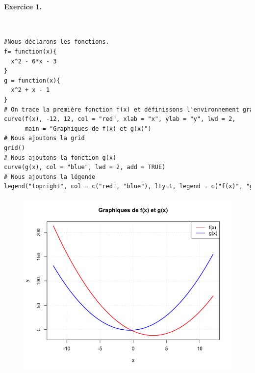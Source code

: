 \paragraph{Exercice 1. }\textcolor{white}{.}\newline
\begin{lstlisting}[language=html]
#Nous déclarons les fonctions.
f= function(x){
  x^2 - 6*x - 3
}
g = function(x){
  x^2 + x - 1 
}
# On trace la première fonction f(x) et définissons l'environnement graphique
curve(f(x), -12, 12, col = "red", xlab = "x", ylab = "y", lwd = 2,
      main = "Graphiques de f(x) et g(x)")
# Nous ajoutons la grid
grid()
# Nous ajoutons la fonction g(x)
curve(g(x), col = "blue", lwd = 2, add = TRUE)
# Nous ajoutons la légende
legend("topright", col = c("red", "blue"), lty=1, legend = c("f(x)", "g(x)"))
\end{lstlisting}
\begin{figure}[H]\begin{center}\includegraphics[scale=0.4]{ilu/gra77.png}\end{center}\end{figure}


